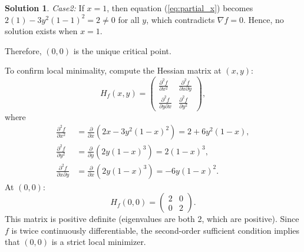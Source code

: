 \documentclass[12pt]{article}
\theoremstyle{definition}
\newtheorem*{solution}{\normalfont\textbf{Solution}}
\begin{document}
\begin{enumerate}[leftmargin=*]
\begin{solution}
            \textit{Case2:} If \( x = 1 \), then equation (\ref{eq:partial_x}) becomes \( 2(1) - 3y^2 (1 - 1)^2 = 2 \neq 0 \) for all \( y \), which contradicts \( \nabla f = 0 \). Hence, no solution exists when \( x = 1 \).
            
            Therefore, \( (0, 0) \) is the unique critical point.

            To confirm local minimality, compute the Hessian matrix at \( (x, y) \):
            \[
            H_f(x, y) = \begin{pmatrix}
            \frac{\partial^2 f}{\partial x^2} & \frac{\partial^2 f}{\partial x \partial y} \\
            \frac{\partial^2 f}{\partial y \partial x} & \frac{\partial^2 f}{\partial y^2}
            \end{pmatrix},
            \]
            where
            \begin{align*}
            \frac{\partial^2 f}{\partial x^2} &= \frac{\partial}{\partial x} \left( 2x - 3y^2 (1 - x)^2 \right) = 2 + 6y^2 (1 - x), \\
            \frac{\partial^2 f}{\partial y^2} &= \frac{\partial}{\partial y} \left( 2y (1 - x)^3 \right) = 2 (1 - x)^3, \\
            \frac{\partial^2 f}{\partial x \partial y} &= \frac{\partial}{\partial x} \left( 2y (1 - x)^3 \right) = -6y (1 - x)^2.
            \end{align*}
            At \( (0, 0) \):
            \[
            H_f(0, 0) = \begin{pmatrix}
            2 & 0 \\
            0 & 2
            \end{pmatrix}.
            \]
            This matrix is positive definite (eigenvalues are both 2, which are positive). Since \( f \) is twice continuously differentiable, the second-order sufficient condition implies that \( (0, 0) \) is a strict local minimizer.
            

\end{solution}
\end{enumerate}
\end{document}
